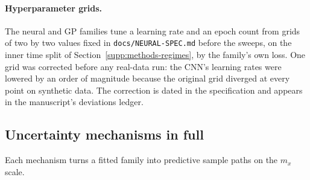 \paragraph{Hyperparameter grids.} The neural and GP families tune a learning
rate and an epoch count from grids of two by two values fixed in
\texttt{docs/NEURAL-SPEC.md} before the sweeps, on the inner time split of
Section~\ref{supp:methods-regimes}, by the family's own loss. One grid was
corrected before any real-data run: the CNN's learning rates were lowered by
an order of magnitude because the original grid diverged at every point on
synthetic data. The correction is dated in the specification and appears in
the manuscript's deviations ledger.

\subsection{Uncertainty mechanisms in full}
\label{sec:design-mechanisms}%
\label{supp:methods-mechanisms}

Each mechanism turns a fitted family into predictive sample paths on the $m_x$
scale.

